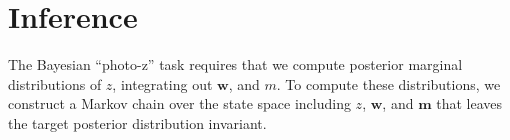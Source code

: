 \documentclass{article} %
\begin{document}

%


\section{Inference}
\label{sec:inference}
The Bayesian ``photo-z'' task requires that we compute posterior marginal distributions of $z$, integrating out $\mathbf{w}$, and $m$.  
To compute these distributions, we construct a Markov chain over the state space including $z$, $\mathbf{w}$, and $\mathbf{m}$ that leaves the target posterior distribution invariant.
\end{document}
